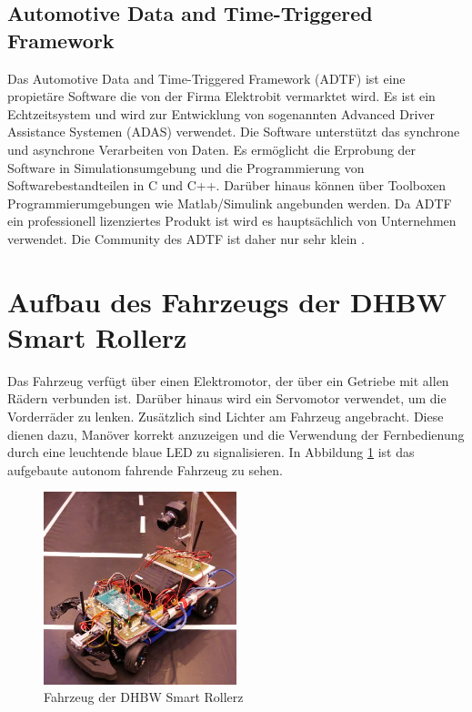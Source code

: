 \subsection{Automotive Data and Time-Triggered Framework}
Das Automotive Data and Time-Triggered Framework (ADTF) ist eine propietäre Software die von der Firma Elektrobit vermarktet wird. Es ist ein Echtzeitsystem und wird zur Entwicklung von sogenannten Advanced Driver Assistance Systemen (ADAS) verwendet. Die Software unterstützt das synchrone und asynchrone Verarbeiten von Daten. Es ermöglicht die Erprobung der Software in Simulationsumgebung und die Programmierung von Softwarebestandteilen in C und C++. Darüber hinaus können über Toolboxen Programmierumgebungen wie Matlab/Simulink angebunden werden. Da ADTF ein professionell lizenziertes Produkt ist wird es hauptsächlich von Unternehmen verwendet. Die Community des ADTF ist daher nur sehr klein \cite{AND16}.

\section{Aufbau des Fahrzeugs der DHBW Smart Rollerz}
Das Fahrzeug verfügt über einen Elektromotor, der über ein Getriebe mit allen Rädern verbunden ist. Darüber hinaus wird ein Servomotor verwendet, um die Vorderräder zu lenken. Zusätzlich sind Lichter am Fahrzeug angebracht. Diese dienen dazu, Manöver korrekt anzuzeigen und die Verwendung der Fernbedienung durch eine leuchtende blaue LED zu signalisieren. In Abbildung \ref{sen:zeg} ist das aufgebaute autonom fahrende Fahrzeug zu sehen.

\FloatBarrier
\begin{figure}[h]
  \centering
  \includegraphics[width=0.5\textwidth]{images/stand_der_technik/SR_Fahrzeug.JPG}
  \caption[Fahrzeug der DHBW Smart Rollerz]{Fahrzeug der DHBW Smart Rollerz}
  \label{sen:zeg}
\end{figure}
\FloatBarrier


